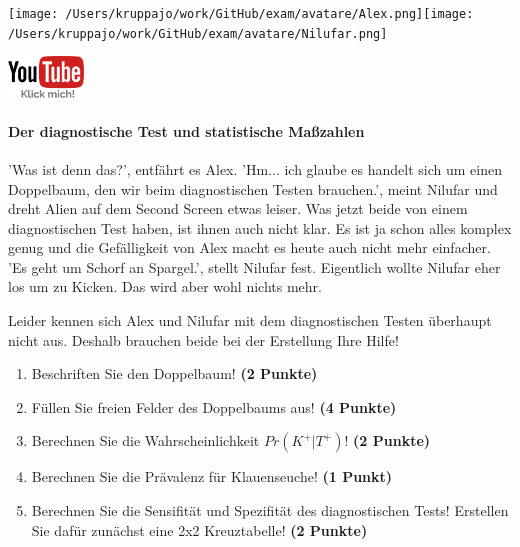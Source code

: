\documentclass[a4paper, 9pt]{scrartcl}\usepackage[]{graphicx}\usepackage[]{xcolor}
\begin{document}
 
\begin{minipage}[t]{0.5\textwidth}
\texttt{[image: /Users/kruppajo/work/GitHub/exam/avatare/Alex.png]}\hspace{-4mm}\texttt{[image: /Users/kruppajo/work/GitHub/exam/avatare/Nilufar.png]}
\end{minipage}
\begin{minipage}[t]{0.5\textwidth}
\hfill
\href{https://youtu.be/_7s44pbOc00}{\includegraphics[width = 2cm]{img/youtube}}
\end{minipage}



\paragraph{Der diagnostische Test und statistische Maßzahlen}

'Was ist denn das?', entfährt es Alex. 'Hm... ich glaube es handelt sich um einen Doppelbaum, den wir beim diagnostischen Testen brauchen.', meint Nilufar und dreht Alien auf dem Second Screen etwas leiser. Was jetzt beide von einem diagnostischen Test haben, ist ihnen auch nicht klar. Es ist ja schon alles komplex genug und die Gefälligkeit von Alex macht es heute auch nicht mehr einfacher. 'Es geht um Schorf an Spargel.', stellt Nilufar fest. Eigentlich wollte Nilufar eher los um zu Kicken. Das wird aber wohl nichts mehr.


Leider kennen sich Alex und Nilufar mit dem diagnostischen Testen überhaupt nicht aus. Deshalb brauchen beide bei der Erstellung Ihre Hilfe! 
  
\begin{enumerate}
\item Beschriften Sie den Doppelbaum! \textbf{(2 Punkte)}
\item Füllen Sie freien Felder des Doppelbaums aus! \textbf{(4 Punkte)}
\item Berechnen Sie die Wahrscheinlichkeit $Pr(K^+|T^+)$! \textbf{(2 Punkte)}
\item Berechnen Sie die Prävalenz für Klauenseuche! \textbf{(1 Punkt)}
\item Berechnen Sie die Sensifität und Spezifität des diagnostischen Tests! Erstellen Sie dafür zunächst eine 2x2 Kreuztabelle! \textbf{(2 Punkte)}
\end{enumerate}
\end{document}
